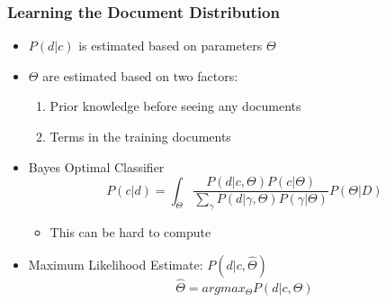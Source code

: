 \documentclass{beamer}
\begin{document}

\begin{frame} \frametitle{Learning the Document Distribution}
  
  \begin{itemize}
  \item $P(d|c)$ is estimated based on parameters $\Theta$
  \item $\Theta$ are estimated based on two factors:
    \begin{enumerate}
    \item Prior knowledge before seeing any documents
    \item Terms in the training documents
    \end{enumerate}
  \item Bayes Optimal Classifier
    \begin{displaymath}
      P(c|d) = \int_\Theta\frac{P(d|c,\Theta)P(c|\Theta)}
      {\sum_{\gamma}P(d|\gamma,\Theta)P(\gamma|\Theta)} P(\Theta|D)
    \end{displaymath}
    \begin{itemize}
    \item This can be hard to compute
    \end{itemize}
  \item Maximum Likelihood Estimate: $P(d|c, \hat{\Theta})$
    \begin{displaymath}
        \hat{\Theta} = argmax_\Theta P(d|c,\Theta)
    \end{displaymath}
  \end{itemize}

\end{frame}

\end{document}
